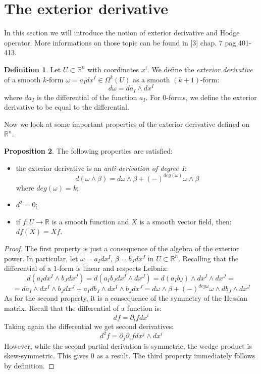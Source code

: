 \documentclass[12pt,a4paper]{report}
\theoremstyle{definition}
\newtheorem{Def}{Definition}[chapter]
\theoremstyle{Theorem}
\newtheorem{Prop}[Def]{Proposition}
\theoremstyle{definition}
\theoremstyle{definition}
\begin{document}
	\section{The exterior derivative}\label{Sec_1.7}
	In this section we will introduce the notion of exterior derivative and Hodge operator. More informations on those topic can be found in [3] chap. 7 pag 401-413.
	\begin{Def}
		Let $U\subset \mathbb{R}^n$ with coordinates $x^i$. We define the \textit{exterior derivative} of a smooth $k$-form $\omega=a_Idx^I\in \Omega^k(U)$ as a smooth $(k+1)$-form:
		$$d\omega=da_I\wedge dx^I$$
		where $da_I$ is the differential of the function $a_I$. For 0-forms, we define the exterior derivative to be equal to the differential.
	\end{Def}
	Now we look at some important properties of the exterior derivative defined on $\mathbb{R}^n$.
	\begin{Prop}
		The following properties are satisfied:
		\begin{itemize}
			\item the exterior derivative is an \textit{anti-derivation of degree 1}: $$d(\omega\wedge\beta)=d\omega\wedge\beta+(-)^{deg(\omega)}\omega\wedge\beta$$
			where $deg(\omega)=k$;
			\item $d^2=0$;
			\item if $f:U\rightarrow \mathbb{R}$ is a smooth function and $X$ is a smooth vector field, then: $df(X)=Xf$.
		\end{itemize}
	\end{Prop}
	\begin{proof}
		The first property is just a consequence of the algebra of the exterior power. In particular, let $\omega=a_Idx^I$, $\beta=b_Jdx^J$ in $U\subset \mathbb{R}^n$. Recalling that the differential of a $1$-form is linear and respects Leibniz:
		$$d(a_Idx^I\wedge b_Jdx^J)=d(a_Ib_Jdx^I\wedge dx^J)=d(a_Ib_J)\wedge dx^I\wedge dx^J=$$
		$$=da_I\wedge dx^I\wedge b_Jdx^J+a_Idb_J\wedge dx^I\wedge b_Jdx^J=d\omega\wedge\beta+(-)^{deg\omega}\omega\wedge db_J\wedge dx^J$$
		As for the second property, it is a consequence of the symmetry of the Hessian matrix. Recall that the differential of a function is:
		$$df=\partial_ifdx^i$$
		Taking again the differential we get second derivatives:
		$$d^2f=\partial_j\partial_i f dx^j\wedge dx^i$$
		However, while the second partial derivation is symmetric, the wedge product is skew-symmetric. This gives 0 as a result. The third property immediately follows by definition.
	\end{proof}
\end{document}
